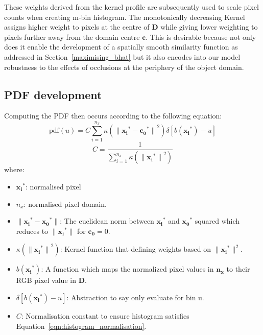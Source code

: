 These weights derived from the kernel profile are subsequently used to scale
pixel counts when creating m-bin histogram. The monotonically decreasing Kernel
assigns higher weight to pixels at the centre of $\mathbf{D}$ while giving lower
weighting to pixels further away from the domain centre $\mathbf{c}$. 
This is desirable because not only does it enable the development of a spatially
smooth similarity function as addressed in Section~\ref{maximising_bhat} but it
also encodes into our model robustness to the effects of occlusions at the
periphery of the object domain.

\subsection{PDF development}
Computing the PDF then occurs according to the following equation:
\begin{equation}\label{eqn:mean_shift_histogram}
    \text{pdf}(u)=C\sum_{i=1}^{n_x}\kappa({\parallel{\mathbf{x_i}^*}-{\mathbf{c_0}^*}\parallel}^2)\delta[b(\mathbf{x_i}^*)-u]    
\end{equation}
\begin{equation}\label{eqn:histogram_normalisation}
    C=\frac{1}{\sum_{i=1}^{n_x}\kappa({\parallel\mathbf{x_i}^*\parallel}^2)}
\end{equation}
where:
\begin{itemize}
    \item $\mathbf{x_i}^*$: normalised pixel 
    \item $n_x$: normalised pixel domain.
    \item $\parallel{\mathbf{x_i}}^*-{\mathbf{x_0}}^*\parallel$: The euclidean
        norm between $\mathbf{x_i}^*$ and ${\mathbf{x_0}}^*$ squared which
        reduces to $\parallel{\mathbf{x_i}}^*\parallel$ for $\mathbf{c_0} = 0$. 
    \item $\kappa({\parallel{\mathbf{x_i}}^*\parallel}^2)$: Kernel function that
        defining weights based on $\parallel{\mathbf{x_i}}^*\parallel^2$.
    \item $b({\mathbf{x_i}}^*)$: A function which maps the normalized pixel
        values in $\mathbf{n_x}$ to their RGB pixel value in $\mathbf{D}$.
    \item $\delta[b({\mathbf{x_i}}^*)-u]$: Abstraction to say only evaluate for bin u.
    \item $C$: Normalisation constant to ensure histogram satisfies Equation~\ref{eqn:histogram_normalisation}.
\end{itemize}

